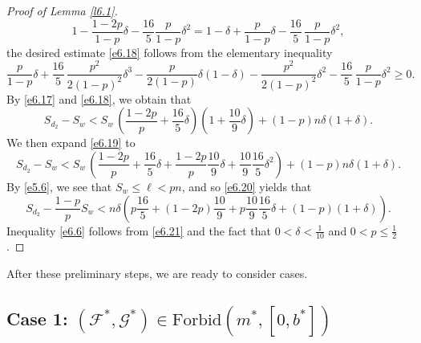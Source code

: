 \documentclass[10pt,a4paper]{amsart}
\theoremstyle{remark}
\newcommand{\meg}{\geqslant}
\newcommand{\mik}{\leqslant}
\newcommand{\Fcal}{\mathcal{F}}
\newcommand{\Gcal}{\mathcal{G}}
\begin{document}
\begin{proof}[Proof of Lemma \emph{\ref{l6.1}}]
\begin{equation}
1-\frac{1-2p}{1-p}\delta-\frac{16}{5}\frac{p}{1-p}\delta^2 =
1-\delta+ \frac{p}{1-p}\delta -\frac{16}{5}\, \frac{p}{1-p}\delta^2,
\end{equation}
the desired estimate \eqref{e6.18} follows from the elementary inequality
\begin{equation} \label{en.6.3}
\frac{p}{1-p}\delta + \frac{16}{5}\, \frac{p^2}{2(1-p)^2}\delta^3
- \frac{p}{2(1-p)}\delta(1-\delta) - \frac{p^2}{2(1-p)^2}\delta^2
- \frac{16}{5}\, \frac{p}{1-p}\delta^2 \meg 0.
\end{equation}
By \eqref{e6.17} and \eqref{e6.18}, we obtain that
\begin{equation} \label{e6.19}
S_{d_2}-S_w < S_w\, \left(\frac{1-2p}{p}+\frac{16}{5}\delta\right)
\left(1+\frac{10}{9}\delta\right)+(1-p)n\delta\left(1+\delta\right).
\end{equation}
We then expand \eqref{e6.19} to
\begin{equation} \label{e6.20}
S_{d_2}-S_w < S_w\, \left(\frac{1-2p}{p}+ \frac{16}{5}\delta+ \frac{1-2p}{p}\frac{10}{9}\delta +\frac{10}{9}\frac{16}{5}\delta^2\right)+(1-p)n\delta\left(1+\delta\right).
\end{equation}
By \eqref{e5.6}, we see that $S_w\mik \ell< pn$, and so \eqref{e6.20} yields that
\begin{equation} \label{e6.21}
S_{d_2}-\frac{1-p}{p}S_w < n\delta \left(p\frac{16}{5}+(1-2p)\frac{10}{9}+p\frac{10}{9}\frac{16}{5}\delta+(1-p)\left(1+\delta\right)\right).
\end{equation}
Inequality \eqref{e6.6} follows from \eqref{e6.21} and the fact that
$0<\delta<\frac{1}{10}$ and $0<p\mik\frac{1}{2}$.
\end{proof}
After these preliminary steps, we are ready to consider cases.

\subsection*{Case 1: $(\Fcal^*,\Gcal^*)\in\mathrm{Forbid}(m^*,[0,b^*])$}
\end{document}
